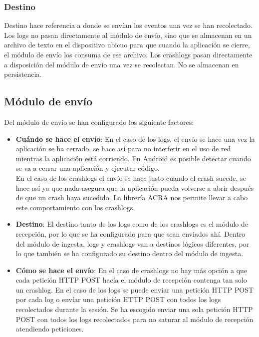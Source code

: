 \subsubsection{Destino}
Destino hace referencia a donde se envían los eventos una vez se han recolectado. 
Los logs no pasan directamente al módulo de envío, sino que se almacenan en un archivo de texto en el dispositivo ubicuo para que cuando la aplicación se cierre, el módulo de envío los consuma de ese archivo.
Los crashlogs pasan directamente a disposición del módulo de envío una vez se recolectan. No se almacenan en persistencia. 

\subsection{Módulo de envío}

Del módulo de envío se han configurado los siguiente factores:

\begin{itemize}
	\item \textbf{Cuándo se hace el envío}: En el caso de los logs, el envío se hace una vez la aplicación se ha cerrado, se hace así para no interferir en el uso de red mientras la aplicación está corriendo. En Android es posible detectar cuando se va a cerrar una aplicación y ejecutar código. \\ En el caso de los crashlogs el envío se hace justo cuando el crash sucede, se hace así ya que nada asegura que la aplicación pueda volverse a abrir después de que un crash haya sucedido. La librería ACRA nos permite llevar a cabo este comportamiento con los crashlogs.
	
	\item \textbf{Destino}: El destino tanto de los logs como de los crashlogs es el módulo de recepción, por lo que se ha configurado para que sean enviados ahí. Dentro del módulo de ingesta, logs y crashlogs van a destinos lógicos diferentes, por lo que también se ha configurado su destino dentro del módulo de ingesta.
	
	\item \textbf{Cómo se hace el envío}: En el caso de crashlogs no hay más opción a que cada petición HTTP POST hacía el módulo de recepción contenga tan solo un crashlog. En el caso de los logs se puede enviar una petición HTTP POST por cada log o envíar una petición HTTP POST con todos los logs recolectados durante la sesión. Se ha escogido enviar una sola petición HTTP POST con todos los logs recolectados para no saturar al módulo de recepción atendiendo peticiones.
\end{itemize}

